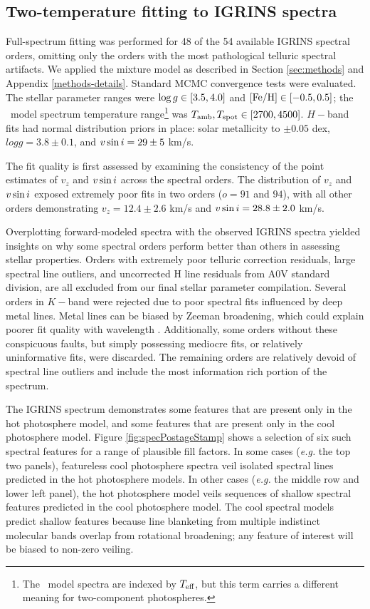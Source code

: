 \documentclass[twocolumn]{emulateapj}%
\begin{document}


\subsection{Two-temperature fitting to IGRINS spectra}\label{sec:two_tempIGRINS}


Full-spectrum fitting was performed for 48 of the 54 available IGRINS spectral orders, omitting only the orders with the most pathological telluric spectral artifacts. We applied the mixture model as described in Section \ref{sec:methods} and Appendix \ref{methods-details}.  Standard MCMC convergence tests were evaluated.  The stellar parameter ranges were $\log g \in [3.5, 4.0]$ and $[{\rm Fe}/{\rm H}] \in [-0.5, 0.5]$; the \PHOENIX\ model spectrum temperature range\footnote{The \PHOENIX\ model spectra are indexed by $T_\textrm{eff}$, but this term carries a different meaning for two-component photospheres.} was $T_\textrm{amb}, T_\textrm{spot} \in [2700, 4500]$.  $H-$band fits had normal distribution priors in place: solar metallicity to $\pm0.05$ dex, $logg=3.8\pm0.1$, and $v \sin i=29\pm5$ km/s.

The fit quality is first assessed by examining the consistency of the point estimates of $v_z$ and $v \sin i$ across the spectral orders.  The distribution of $v_z$ and $v \sin i$ exposed extremely poor fits in two orders ($o=91$ and $94$), with all other orders demonstrating $v_z = 12.4 \pm 2.6$ km/s and $v \sin i = 28.8 \pm 2.0$ km/s.

Overplotting forward-modeled spectra with the observed IGRINS spectra yielded insights on why some spectral orders perform better than others in assessing stellar properties.  Orders with extremely poor telluric correction residuals, large spectral line outliers, and uncorrected H line residuals from A0V standard division, are all excluded from our final stellar parameter compilation.  Several orders in $K-$band were rejected due to poor spectral fits influenced by deep metal lines.  Metal lines can be biased by Zeeman broadening, which could explain poorer fit quality with wavelength \citep{johnskrull07,deen13}.  Additionally, some orders without these conspicuous faults, but simply possessing mediocre fits, or relatively uninformative fits, were discarded.  The remaining orders are relatively devoid of spectral line outliers and include the most information rich portion of the spectrum.

The IGRINS spectrum demonstrates some features that are present only in the hot photosphere model, and some features that are present only in the cool photosphere model.  Figure \ref{fig:specPostageStamp} shows a selection of six such spectral features for a range of plausible fill factors.  In some cases (\emph{e.g.} the top two panels), featureless cool photosphere spectra veil isolated spectral lines predicted in the hot photosphere models.  In other cases (\emph{e.g.} the middle row and lower left panel), the hot photosphere model veils sequences of shallow spectral features predicted in the cool photosphere model.  The cool spectral models predict shallow features because line blanketing from multiple indistinct molecular bands overlap from rotational broadening; any feature of interest will be biased to non-zero veiling.  
\end{document}
